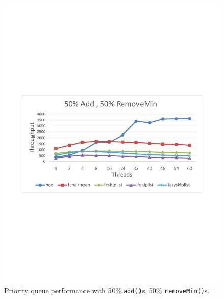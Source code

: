 \begin{figure}[htb]
\centering
\begin{minipage}[b]{.495\textwidth}
	\centering
  \includegraphics[width=\linewidth]{img/sparc-50-50.pdf}
\caption{Priority queue performance with 50\% \texttt{add()}s, 50\% \texttt{removeMin()}s.}
\label{fig:sparc_50}
\end{minipage}%
\hfill%
\begin{minipage}[b]{.495\textwidth}
	\centering

\end{minipage}
\end{figure}
